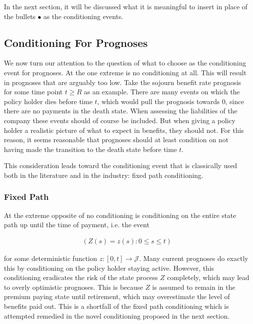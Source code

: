 \documentclass{article}
\newcommand{\1}[1]{\mathbbm{1}_{\left\lbrace #1 \right\rbrace}}
\theoremstyle{break}
\theoremstyle{remark}
\numberwithin{equation}{section}
\begin{document}
In the next section, it will be discussed what it is meaningful to insert in place of the bullets $\bullet$ as the conditioning events.

\subsection{Conditioning For Prognoses} \label{CondForProg}

We now turn our attention to the question of what to choose as the conditioning event for prognoses. At the one extreme is no conditioning at all. This will result in prognoses that are arguably too low. Take the sojourn benefit rate prognosis for some time point $t \geq R$ as an example. There are many events on which the policy holder dies before time $t$, which would pull the prognosis towards 0, since there are no payments in the death state. When assessing the liabilities of the company these events should of course be included. But when giving a policy holder a realistic picture of what to expect in benefits, they should not. For this reason, it seems reasonable that prognoses should at least condition on not having made the transition to the death state before time $t$.

This consideration leads toward the conditioning event that is classically used both in the literature and in the industry: fixed path conditioning.

\subsubsection{Fixed Path}

At the extreme opposite of no conditioning is conditioning on the entire state path up until the time of payment, i.e. the event

\begin{align} \label{FixedPathz}
\left( Z(s) = z(s) : 0 \leq s \leq t \right)
\end{align}

for some deterministic function $z: [0,t] \to \mathcal{J}$. Many current prognoses do exactly this by conditioning on the policy holder staying active. However, this conditioning eradicates the risk of the state process $Z$ completely, which may lead to overly optimistic prognoses. This is because $Z$ is assumed to remain in the premium paying state until retirement, which may overestimate the level of benefits paid out. This is a shortfall of the fixed path conditioning which is attempted remedied in the novel conditioning proposed in the next section.
\end{document}
